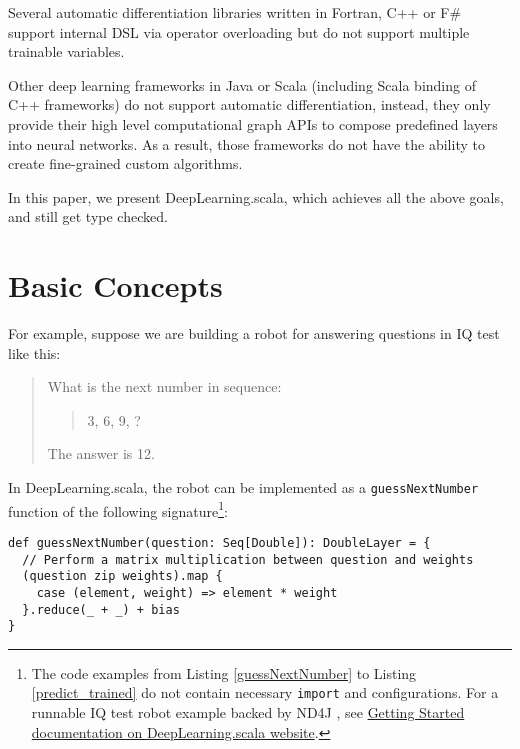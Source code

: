 Several automatic differentiation libraries \cite{bischof1992adifor,griewank1996algorithm,TapenadeRef13,baydin2015diffsharp} written in Fortran, C++ or F\# support internal DSL via operator overloading but do not support multiple trainable variables.

Other deep learning frameworks in Java or Scala (including Scala binding of C++ frameworks) \cite{intel2016bigdl,skymind2017deeplearning4j,baydin2016hype,chen2017typesafe} do not support automatic differentiation, instead, they only provide their high level computational graph APIs to compose predefined layers into neural networks. As a result, those frameworks do not have the ability to create fine-grained custom algorithms.

In this paper, we present DeepLearning.scala, which achieves all the above goals, and still get type checked.

\section{Basic Concepts\label{concepts}}

For example, suppose we are building a robot for answering questions in IQ test like this:

\begin{quote}
  What is the next number in sequence:
    \begin{quote}
    3, 6, 9, ?
    \end{quote}
  The answer is 12.
\end{quote}

In DeepLearning.scala, the robot can be implemented as a \lstinline{guessNextNumber} function of the following signature\footnote{The code examples from Listing \ref{guessNextNumber} to Listing \ref{predict_trained} do not contain necessary \lstinline{import} and configurations. For a runnable IQ test robot example backed by ND4J \cite{skymind2017nd4j}, see \href{http://deeplearning.thoughtworks.school/demo/GettingStarted.html}{Getting Started documentation on DeepLearning.scala website}.}:

\begin{lstlisting}[float={htbp},caption={The differentiable matrix multiplication implemented by \lstinline{map}/\lstinline{reduce}},label={guessNextNumber}]
def guessNextNumber(question: Seq[Double]): DoubleLayer = {
  // Perform a matrix multiplication between question and weights
  (question zip weights).map {
    case (element, weight) => element * weight
  }.reduce(_ + _) + bias
}
\end{lstlisting}

